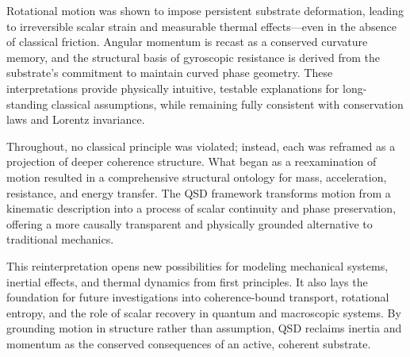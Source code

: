 \documentclass[entropy,article,submit,pdftex,moreauthors]{Definitions/mdpi}
\begin{document}
Rotational motion was shown to impose persistent substrate deformation, leading to irreversible scalar strain and measurable thermal effects—even in the absence of classical friction. Angular momentum is recast as a conserved curvature memory, and the structural basis of gyroscopic resistance is derived from the substrate's commitment to maintain curved phase geometry. These interpretations provide physically intuitive, testable explanations for long-standing classical assumptions, while remaining fully consistent with conservation laws and Lorentz invariance.

Throughout, no classical principle was violated; instead, each was reframed as a projection of deeper coherence structure. What began as a reexamination of motion resulted in a comprehensive structural ontology for mass, acceleration, resistance, and energy transfer. The QSD framework transforms motion from a kinematic description into a process of scalar continuity and phase preservation, offering a more causally transparent and physically grounded alternative to traditional mechanics.

This reinterpretation opens new possibilities for modeling mechanical systems, inertial effects, and thermal dynamics from first principles. It also lays the foundation for future investigations into coherence-bound transport, rotational entropy, and the role of scalar recovery in quantum and macroscopic systems. By grounding motion in structure rather than assumption, QSD reclaims inertia and momentum as the conserved consequences of an active, coherent substrate.



\vspace{6pt} 



\end{document}

